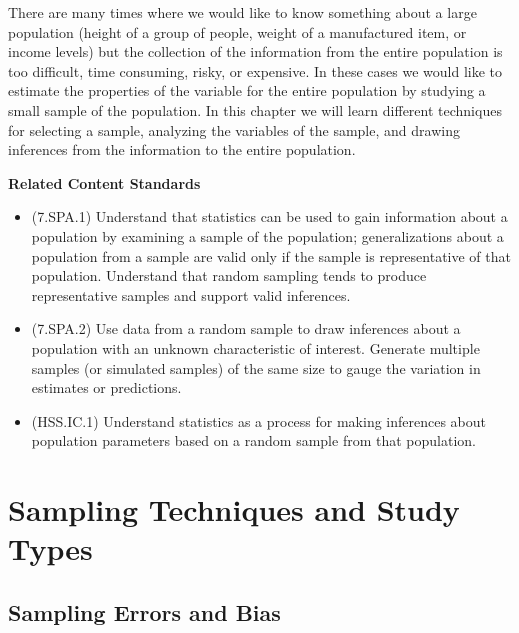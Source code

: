 \documentclass[
]{book}
\providecommand{\tightlist}{%
  \setlength{\itemsep}{0pt}\setlength{\parskip}{0pt}}
\newenvironment{standards}{}{}
\let\stdsection\section
\renewcommand\section{\newpage\stdsection}
\theoremstyle{definition}
\theoremstyle{definition}
\theoremstyle{definition}
\theoremstyle{definition}
\theoremstyle{remark}
\begin{document}
There are many times where we would like to know something about a large population (height of a group of people, weight of a manufactured item, or income levels) but the collection of the information from the entire population is too difficult, time consuming, risky, or expensive. In these cases we would like to estimate the properties of the variable for the entire population by studying a small sample of the population. In this chapter we will learn different techniques for selecting a sample, analyzing the variables of the sample, and drawing inferences from the information to the entire population.

\begin{standards}

\begin{center}
\textbf{Related Content Standards}

\end{center}

\begin{itemize}
\tightlist
\item
  (7.SPA.1) Understand that statistics can be used to gain information about a population by examining a sample of the population; generalizations about a population from a sample are valid only if the sample is representative of that population. Understand that random sampling tends to produce representative samples and support valid inferences.
\item
  (7.SPA.2) Use data from a random sample to draw inferences about a population with an unknown characteristic of interest. Generate multiple samples (or simulated samples) of the same size to gauge the variation in estimates or predictions.
\item
  (HSS.IC.1) Understand statistics as a process for making inferences about population parameters based on a random sample from that population.
\end{itemize}

\end{standards}

\hypertarget{sampling-techniques-and-study-types}{%
\section{Sampling Techniques and Study Types}\label{sampling-techniques-and-study-types}}

\hypertarget{sampling-errors-and-bias}{%
\subsection{Sampling Errors and Bias}\label{sampling-errors-and-bias}}
\end{document}
